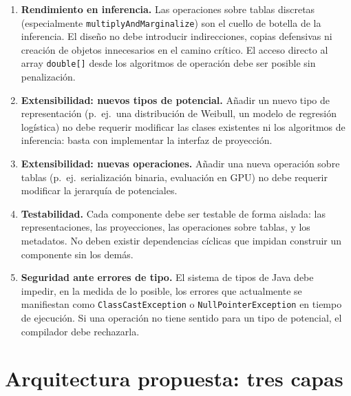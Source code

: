 \documentclass[11pt,a4paper]{article}
\newcommand{\code}[1]{\texttt{#1}}
\begin{document}
\begin{enumerate}[label=\textbf{RNF\arabic*}]
  \item \textbf{Rendimiento en inferencia.}
        Las operaciones sobre tablas discretas (especialmente
        \code{multiplyAndMarginalize}) son el cuello de botella de la
        inferencia.  El diseño no debe introducir indirecciones, copias
        defensivas ni creación de objetos innecesarios en el camino
        crítico.  El acceso directo al array \code{double[]} desde los
        algoritmos de operación debe ser posible sin penalización.
        \label{req:rnf1}

  \item \textbf{Extensibilidad: nuevos tipos de potencial.}
        Añadir un nuevo tipo de representación (p.~ej.\ una distribución
        de Weibull, un modelo de regresión logística) no debe requerir
        modificar las clases existentes ni los algoritmos de inferencia:
        basta con implementar la interfaz de proyección.
        \label{req:rnf2}

  \item \textbf{Extensibilidad: nuevas operaciones.}
        Añadir una nueva operación sobre tablas (p.~ej.\ serialización
        binaria, evaluación en GPU) no debe requerir modificar la jerarquía
        de potenciales.
        \label{req:rnf3}

  \item \textbf{Testabilidad.}
        Cada componente debe ser testable de forma aislada: las
        representaciones, las proyecciones, las operaciones sobre tablas,
        y los metadatos.  No deben existir dependencias cíclicas que
        impidan construir un componente sin los demás.
        \label{req:rnf4}

  \item \textbf{Seguridad ante errores de tipo.}
        El sistema de tipos de Java debe impedir, en la medida de lo posible,
        los errores que actualmente se manifiestan como \code{ClassCastException}
        o \code{NullPointerException} en tiempo de ejecución.  Si una operación
        no tiene sentido para un tipo de potencial, el compilador debe
        rechazarla.
        \label{req:rnf5}
\end{enumerate}

\section{Arquitectura propuesta: tres capas}
\label{sec:ideal-arquitectura}
\end{document}
